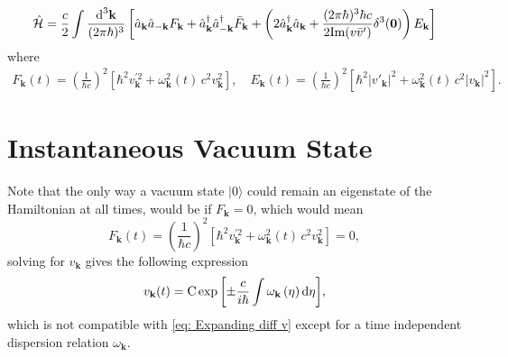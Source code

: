 \begin{equation}
	\hat{\mathcal{H}}=\frac{c}{2}\int\frac{\text{d}^3\mathbf{k}}{(2\pi\hbar)^3}\left[\hat{a}_\mathbf{k}\hat{a}_{-\mathbf{k}}F_\mathbf{k}+\hat{a}^\dagger_\mathbf{k}\hat{a}^\dagger_{-\mathbf{k}}\bar F_\mathbf{k}+\left(2\hat{a}_\mathbf{k}^\dagger\hat{a}_\mathbf{k}+\frac{(2\pi\hbar)^3\hbar c}{2\text{Im}(v\bar v')}\delta^3(\mathbf{0})\right)E_\mathbf{k}\right]
\end{equation}
where
\begin{subequations}
	\begin{gather}
		F_\mathbf{k}(t)=\left(\frac{1}{\hbar c}\right)^2\left[\hbar^2v^{'2}_\mathbf{k}+\omega^2_\mathbf{k}(t)\,c^2 v_\mathbf{k}^2\right],\quad E_\mathbf{k}(t)=\left(\frac{1}{\hbar c}\right)^2\left[\hbar^2\big|v'_\mathbf{k}\big|^2+\omega^2_\mathbf{k}(t)\,c^2 \big|v_\mathbf{k}\big|^2\right].\tag{\theequation \,\,a,b}
	\end{gather}
\end{subequations}
\section{Instantaneous Vacuum State}
Note that the only way a vacuum state $|0\rangle$ could remain an eigenstate of the Hamiltonian at all times, would be if $F_\mathbf{k}=0$, which would mean
\begin{equation}
	F_\mathbf{k}(t)=\left(\frac{1}{\hbar c}\right)^2\left[\hbar^2v^{'2}_\mathbf{k}+\omega^2_\mathbf{k}(t)\,c^2 v_\mathbf{k}^2\right]=0,
\end{equation}
solving for $v_\mathbf{k}$ gives the following expression
\begin{equation}
	v_\mathbf{k}(t)=\text{C}\exp{\left[\pm \frac{c}{i\hbar}\int\omega_\mathbf{k}\left(\eta\right)\text{d}\eta\right]},
\end{equation}
which is not compatible with \ref{eq: Expanding diff v} except for a time independent dispersion relation $\omega_\mathbf{k}$.

